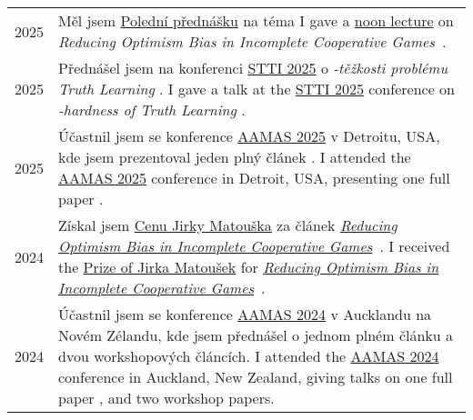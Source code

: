 \section{}

\begin{tabularx}{\linewidth}{>{\raggedleft\scshape}p{2cm}X}
	2025          & \lng
	{Měl jsem \href{https://www.mff.cuni.cz/en/kam/teaching-and-seminars/noon-lectures/2025/30102025}{Polední přednášku} na téma}
	{I gave a \href{https://www.mff.cuni.cz/en/kam/teaching-and-seminars/noon-lectures/2025/30102025}{noon lecture} on}
	 \emph{Reducing Optimism Bias in Incomplete Cooperative Games}~\cite{10.5555/3635637.3663047}.
	\\
	2025          & \lng
	{Přednášel jsem na konferenci \href{https://www.mff.cuni.cz/cs/iuuk/akce/konference/stti-2025}{STTI 2025} o \emph{\np-těžkosti problému Truth Learning} \cite{aamas25}.}
	{I gave a talk at the \href{https://www.mff.cuni.cz/cs/iuuk/akce/konference/stti-2025}{STTI 2025} conference on \emph{\np-hardness of Truth Learning} \cite{aamas25}.}
	\\
	2025          & \lng
	{Účastnil jsem se konference \href{https://www.aamas2025.org/}{AAMAS 2025} v Detroitu, USA, kde jsem prezentoval jeden plný článek \cite{aamas25}.}
	{I attended the \href{https://www.aamas2025.org/}{AAMAS 2025} conference in Detroit, USA, presenting one full paper \cite{aamas25}.}
	\\
	2024          & \lng
	{Získal jsem \href{https://www.mff.cuni.cz/cs/kam/vyzkum/cena-jirky-matouska}{Cenu Jirky Matouška} za článek  \href{https://furadnik.github.io/projects/2024_reducing}{\emph{Reducing Optimism Bias in Incomplete Cooperative Games}}~\cite{10.5555/3635637.3663047}.}
	{I received the \href{https://www.mff.cuni.cz/en/kam/research/prize-of-jirka-matousek}{Prize of Jirka Matoušek} for \href{https://www.mff.cuni.cz/cs/kam/vyzkum/cena-jirky-matouska}{\emph{Reducing Optimism Bias in Incomplete Cooperative Games}}~\cite{10.5555/3635637.3663047}.} \\
	2024          & \lng
	{Účastnil jsem se konference \href{https://www.aamas2024-conference.auckland.ac.nz/}{AAMAS 2024} v Aucklandu na Novém Zélandu, kde jsem přednášel o jednom plném článku \cite{10.5555/3635637.3663047} a dvou workshopových článcích.}
	{I attended the \href{https://www.aamas2024-conference.auckland.ac.nz/}{AAMAS 2024} conference in Auckland, New Zealand, giving talks on one full paper \cite{10.5555/3635637.3663047}, and two workshop papers.}
	\\

\end{tabularx}
